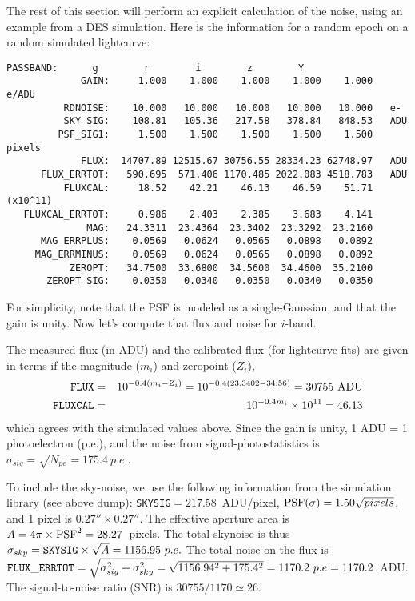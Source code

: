 \documentclass[12pt]{article}
\begin{document}
{\bigskip
The rest of this section will perform an explicit calculation
of the noise, using an example from a DES simulation.
Here is the information for a random epoch on a random
simulated lightcurve:

\clearpage
\begin{Verbatim}[frame=single]
        PASSBAND:      g        r        i        z        Y   
             GAIN:     1.000    1.000    1.000    1.000    1.000   e/ADU 
          RDNOISE:    10.000   10.000   10.000   10.000   10.000   e- 
          SKY_SIG:    108.81   105.36   217.58   378.84   848.53   ADU 
         PSF_SIG1:     1.500    1.500    1.500    1.500    1.500   pixels 
             FLUX:  14707.89 12515.67 30756.55 28334.23 62748.97   ADU 
      FLUX_ERRTOT:   590.695  571.406 1170.485 2022.083 4518.783   ADU  
          FLUXCAL:     18.52    42.21    46.13    46.59    51.71   (x10^11) 
   FLUXCAL_ERRTOT:     0.986    2.403    2.385    3.683    4.141     
              MAG:   24.3311  23.4364  23.3402  23.3292  23.2160     
      MAG_ERRPLUS:    0.0569   0.0624   0.0565   0.0898   0.0892     
     MAG_ERRMINUS:    0.0569   0.0624   0.0565   0.0898   0.0892     
           ZEROPT:   34.7500  33.6800  34.5600  34.4600  35.2100 
       ZEROPT_SIG:    0.0350   0.0340   0.0350   0.0340   0.0350 
\end{Verbatim}
%
For simplicity, note that the PSF is modeled as a single-Gaussian,
and that the gain is unity.  Now let's compute that flux and noise
for $i$-band.

The measured flux (in ADU) and the calibrated flux (for lightcurve fits)
are given in terms if the magnitude ($m_i$) and zeropoint ($Z_i$),
%
\begin{eqnarray}
   {\tt FLUX}    & = & 10^{-0.4(m_i - Z_i)}  =  10^{-0.4(23.3402 - 34.56)} 
        = 30755~{\rm ADU} \\
   {\tt FLUXCAL} & = & 10^{-0.4m_i} \times 10^{11}   =   46.13
\end{eqnarray}
%
which agrees with the simulated values above.
Since the gain is unity, 1 ADU = 1 photoelectron (p.e.),
and the noise from signal-photostatistics is
$\sigma_{sig} = \sqrt{N_{pe}} = 175.4~p.e.$.

To include the sky-noise, we use the following information from the
simulation library (see above dump): 
{\tt SKYSIG}$= 217.58$~ADU/pixel, ${\rm PSF}(\sigma) = 1.50 \sqrt{pixels}$, 
and 1 pixel is $0.27'' \times 0.27''$.
The effective aperture area is $A=4\pi \times {\rm PSF}^2 = 28.27$~pixels.
The total skynoise is thus 
$\sigma_{sky} = {\tt SKYSIG} \times \sqrt{A} = 1156.95~p.e.$
The total noise on the flux is
${\tt FLUX\_ERRTOT} = \sqrt{\sigma_{sig}^2 + \sigma_{sky}^2}
  = \sqrt{1156.94^2 + 175.4^2} = 1170.2~p.e = 1170.2$~ADU.
The signal-to-noise ratio (SNR) is 
$30755/1170 \simeq 26$.

}
\end{document}
